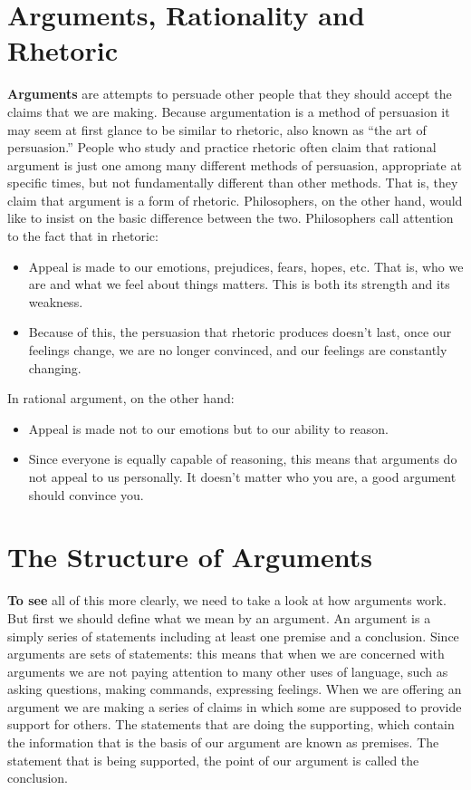 \documentclass[]{book}
\begin{document}
\hypertarget{arguments-rationality-and-rhetoric}{%
\section{Arguments, Rationality and Rhetoric}\label{arguments-rationality-and-rhetoric}}

\textbf{Arguments} are attempts to persuade other people that they should accept the claims that we are making. Because argumentation is a method of persuasion it may seem at first glance to be similar to rhetoric, also known as ``the art of persuasion.'' People who study and practice rhetoric often claim that rational argument is just one among many different methods of persuasion, appropriate at specific times, but not fundamentally different than other methods. That is, they claim that argument is a form of rhetoric. Philosophers, on the other hand, would like to insist on the basic difference between the two. Philosophers call attention to the fact that in rhetoric:

\begin{itemize}
\item
  Appeal is made to our emotions, prejudices, fears, hopes, etc. That is, who we are and what we feel about things matters. This is both its strength and its weakness.
\item
  Because of this, the persuasion that rhetoric produces doesn't last, once our feelings change, we are no longer convinced, and our feelings are constantly changing.
\end{itemize}

In rational argument, on the other hand:

\begin{itemize}
\item
  Appeal is made not to our emotions but to our ability to reason.
\item
  Since everyone is equally capable of reasoning, this means that arguments do not appeal to us personally. It doesn't matter who you are, a good argument should convince you.
\end{itemize}

\hypertarget{the-structure-of-arguments}{%
\section{The Structure of Arguments}\label{the-structure-of-arguments}}

\textbf{To see} all of this more clearly, we need to take a look at how arguments work. But first we should define what we mean by an argument. An argument is a simply series of statements including at least one premise and a conclusion. Since arguments are sets of statements: this means that when we are concerned with arguments we are not paying attention to many other uses of language, such as asking questions, making commands, expressing feelings. When we are offering an argument we are making a series of claims in which some are supposed to provide support for others. The statements that are doing the supporting, which contain the information that is the basis of our argument are known as premises. The statement that is being supported, the point of our argument is called the conclusion.
\end{document}
